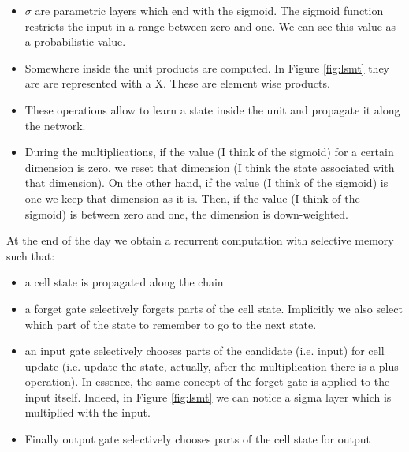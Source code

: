 \begin{itemize}
	\item $\sigma$ are parametric layers which end with the sigmoid. The sigmoid
		function restricts the input in a range between zero and one. We can see this
		value as a probabilistic value.

	\item Somewhere inside the unit products are computed. In Figure
		\ref{fig:lsmt} they are are represented with a X. These are element wise products.

	\item These operations allow to learn a state inside the unit and propagate it
		along the network.

	\item During the multiplications, if the value (I think of the sigmoid) for a
		certain dimension is zero, we reset that dimension (I think the state
		associated with that dimension). On the other hand, if the value (I think of
		the sigmoid) is one we keep that dimension as it is. Then, if the value (I
		think of the sigmoid) is between zero and one, the dimension is down-weighted.
\end{itemize}

At the end of the day we obtain a recurrent computation with selective memory
such that:
\begin{itemize}
	\item a cell state is propagated along the chain

	\item a forget gate selectively forgets parts of the cell state. Implicitly we
		also select which part of the state to remember to go to the next state.

	\item an input gate selectively chooses parts of the candidate (i.e. input)
		for cell update (i.e. update the state, actually, after the multiplication
		there is a plus operation). In essence, the same concept of the forget gate is
		applied to the input itself. Indeed, in Figure \ref{fig:lsmt} we can notice a
		sigma layer which is multiplied with the input.

	\item Finally output gate selectively chooses parts of the cell state for output
\end{itemize}

